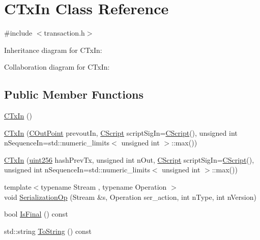 \hypertarget{class_c_tx_in}{}\section{C\+Tx\+In Class Reference}
\label{class_c_tx_in}


{\ttfamily \#include $<$transaction.\+h$>$}



Inheritance diagram for C\+Tx\+In\+:


Collaboration diagram for C\+Tx\+In\+:
\subsection*{Public Member Functions}
\begin{DoxyCompactItemize}
\item 
\hyperlink{class_c_tx_in_abcf9f5a65b0a016b31912f4cd1f32c73}{C\+Tx\+In} ()
\item 
\hyperlink{class_c_tx_in_a243c4c394d5534ed10999b31d025be13}{C\+Tx\+In} (\hyperlink{class_c_out_point}{C\+Out\+Point} prevout\+In, \hyperlink{class_c_script}{C\+Script} script\+Sig\+In=\hyperlink{class_c_script}{C\+Script}(), unsigned int n\+Sequence\+In=std\+::numeric\+\_\+limits$<$ unsigned int $>$\+::max())
\item 
\hyperlink{class_c_tx_in_a168382e68612df987e0241740771ab4e}{C\+Tx\+In} (\hyperlink{classuint256}{uint256} hash\+Prev\+Tx, unsigned int n\+Out, \hyperlink{class_c_script}{C\+Script} script\+Sig\+In=\hyperlink{class_c_script}{C\+Script}(), unsigned int n\+Sequence\+In=std\+::numeric\+\_\+limits$<$ unsigned int $>$\+::max())
\item 
{\footnotesize template$<$typename Stream , typename Operation $>$ }\\void \hyperlink{class_c_tx_in_a3d23c5264c6d93ecf3cf65dd13c55db3}{Serialization\+Op} (Stream \&s, Operation ser\+\_\+action, int n\+Type, int n\+Version)
\item 
bool \hyperlink{class_c_tx_in_aa8110f711e2cdecff45c294ba2ee0a26}{Is\+Final} () const 
\item 
std\+::string \hyperlink{class_c_tx_in_aeac9b3abd4b2d81e9ec4401d1383778d}{To\+String} () const 
\end{DoxyCompactItemize}
